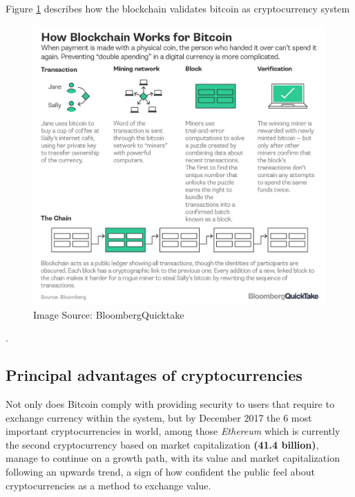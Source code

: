 \documentclass[submission,copyright,creativecommons]{eptcs}
\begin{document}
Figure \ref{fig:block_bloom} describes how the blockchain validates bitcoin as cryptocurrency system\cite{noauthor_bitcoin}
\begin{figure}[h]
    \centering
    \includegraphics[width=5in]{bitcoin-blockchain-bloomberg}
     \caption{Image Source: BloombergQuicktake}
     \label{fig:block_bloom}
\end{figure}.

\subsection{Principal advantages of cryptocurrencies}
Not only does Bitcoin comply with providing security to users that require to exchange currency within the system, but by December 2017\cite{MostImportantCryptocurrencies} the 6 most important cryptocurrencies in world, among those \textit{Ethereum} which is currently the second cryptocurrency based on market capitalization \textbf{(41.4 billion)}, manage to continue on a growth path, with its value and market capitalization following an upwards trend, a sign of how confident the public feel about cryptocurrencies as a method to exchange value.
\end{document}
